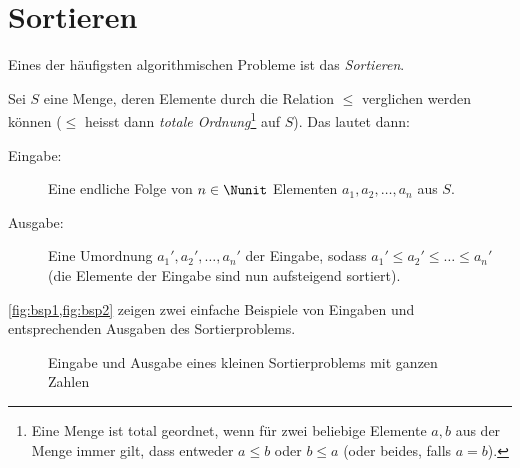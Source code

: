 \chapter{Sortieren}\label{ch:Kapitel05}

Eines der häufigsten algorithmischen Probleme ist das \textit{Sortieren}.
\begin{mydefinition}[Sortierproblem]\label{mydefinition:Sortierproblem}
Sei $S$ eine Menge, deren Elemente durch die Relation $\leq$ verglichen werden können ($\leq$ heisst dann \textit{totale Ordnung}\footnote{Eine Menge ist total geordnet, wenn für zwei beliebige Elemente $a, b$ aus der Menge immer gilt, dass entweder $a \leq b$ oder $b \leq a$ (oder beides, falls $a=b$).} auf $S$). Das  lautet dann:
\begin{description}
	\item[Eingabe:] Eine endliche Folge von $n\in\Nunit$ Elementen $a_1, a_2,\ldots, a_n$ aus $S$.
	\item[Ausgabe:] Eine Umordnung $a_1', a_2', \ldots, a_n'$ der Eingabe, sodass $a_1'\leq a_2' \leq \ldots \leq a_n'$ (die Elemente der Eingabe sind nun aufsteigend sortiert).
\end{description}
\end{mydefinition}
\cref{fig:bsp1,fig:bsp2} zeigen zwei einfache Beispiele von Eingaben und entsprechenden Ausgaben des Sortierproblems.

\begin{figure}[H]
	\def\lvld{1.2}                  %
	\pgfmathsetmacro\shft{-6*\lvld} %
	\centering
	\caption{Eingabe und Ausgabe eines kleinen Sortierproblems mit ganzen Zahlen}
	\label{fig:bsp1}
\end{figure}

